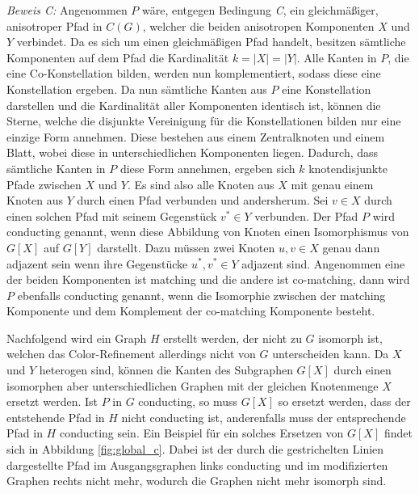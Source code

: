 \emph{Beweis C:} Angenommen $P$ wäre, entgegen Bedingung \emph{C}, ein gleichmäßiger, anisotroper Pfad in $C(G)$, welcher die beiden anisotropen Komponenten $X$ und $Y$ verbindet.
Da es sich um einen gleichmäßigen Pfad handelt, besitzen sämtliche Komponenten auf dem Pfad die Kardinalität $k=|X|=|Y|$.
Alle Kanten in $P$, die eine Co-Konstellation bilden, werden nun komplementiert, sodass diese eine Konstellation ergeben.
Da nun sämtliche Kanten aus $P$ eine Konstellation darstellen und die Kardinalität aller Komponenten identisch ist, können die Sterne, welche die disjunkte Vereinigung für die Konstellationen bilden nur eine einzige Form annehmen.
Diese bestehen aus einem Zentralknoten und einem Blatt, wobei diese in unterschiedlichen Komponenten liegen.
Dadurch, dass sämtliche Kanten in $P$ diese Form annehmen, ergeben sich $k$ knotendisjunkte Pfade zwischen $X$ und $Y$.
Es sind also alle Knoten aus $X$ mit genau einem Knoten aus $Y$ durch einen Pfad verbunden und andersherum.
Sei $v\in X$ durch einen solchen Pfad mit seinem Gegenstück $v^*\in Y$ verbunden.
Der Pfad $P$ wird conducting genannt, wenn diese Abbildung von Knoten einen Isomorphismus von $G[X]$ auf $G[Y]$ darstellt.
Dazu müssen zwei Knoten $u,v\in X$ genau dann adjazent sein wenn ihre Gegenstücke $u^*,v^*\in Y$ adjazent sind.
Angenommen eine der beiden Komponenten ist matching und die andere ist co-matching, dann wird $P$ ebenfalls conducting genannt, wenn die Isomorphie zwischen der matching Komponente und dem Komplement der co-matching Komponente besteht.

Nachfolgend wird ein Graph $H$ erstellt werden, der nicht zu $G$ isomorph ist, welchen das Color-Refinement allerdings nicht von $G$ unterscheiden kann.
Da $X$ und $Y$ heterogen sind, können die Kanten des Subgraphen $G[X]$ durch einen isomorphen aber unterschiedlichen Graphen mit der gleichen Knotenmenge $X$ ersetzt werden.
Ist $P$ in $G$ conducting, so muss $G[X]$ so ersetzt werden, dass der entstehende Pfad in $H$ nicht conducting ist, anderenfalls muss der entsprechende Pfad in $H$ conducting sein.
Ein Beispiel für ein solches Ersetzen von $G[X]$ findet sich in Abbildung \ref{fig:global_c}.
Dabei ist der durch die gestrichelten Linien dargestellte Pfad im Ausgangsgraphen links conducting und im modifizierten Graphen rechts nicht mehr, wodurch die Graphen nicht mehr isomorph sind.

